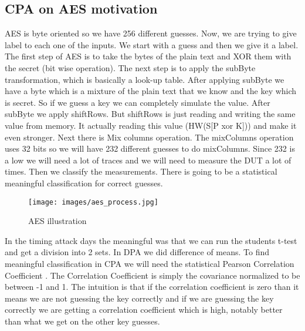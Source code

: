 \subsection{CPA on AES motivation}
AES is byte oriented so we have 256 different guesses. Now, we are trying to give label to each one of the inputs. We start with a guess and then we give it a label. The first step of AES is to take the bytes of the plain text and XOR them with the secret (bit wise operation). The next step is to apply the subByte transformation, which is basically a look-up table. After applying subByte we have a byte which is a mixture of the plain text that we know and the key which is secret. So if we guess a key we can completely simulate the value. After subByte we apply shiftRows. But shiftRows is just reading and writing the same value from memory. It actually reading this value (HW(S[P xor K])) and make it even stronger. Next there is Mix columns operation. The mixColumns operation uses 32 bits so we will have 232 different guesses to do mixColumns. Since 232 is a low we will need a lot of traces and we will need to measure the DUT a lot of times. Then we classify the measurements. There is going to be a statistical meaningful classification for correct guesses.
\begin{figure}[H]
    \centering
    \texttt{[image: images/aes\_process.jpg]}
    \caption{AES illustration} \label{c8_aes:fig}
\end{figure}
In the timing attack days the meaningful was that we can run the students t-test and get a division into 2 sets. In DPA we did  difference of means. To find meaningful classification in CPA we will need the statistical Pearson Correlation Coefficient \cite{PearsonCorrelationCoefficient}. The Correlation Coefficient is simply the covariance normalized to be between -1 and 1. The intuition is that if the correlation coefficient is zero than it means we are not guessing the key correctly and if we are guessing the key correctly we are getting a correlation coefficient which is high, notably better than what we get on the other key guesses. 


